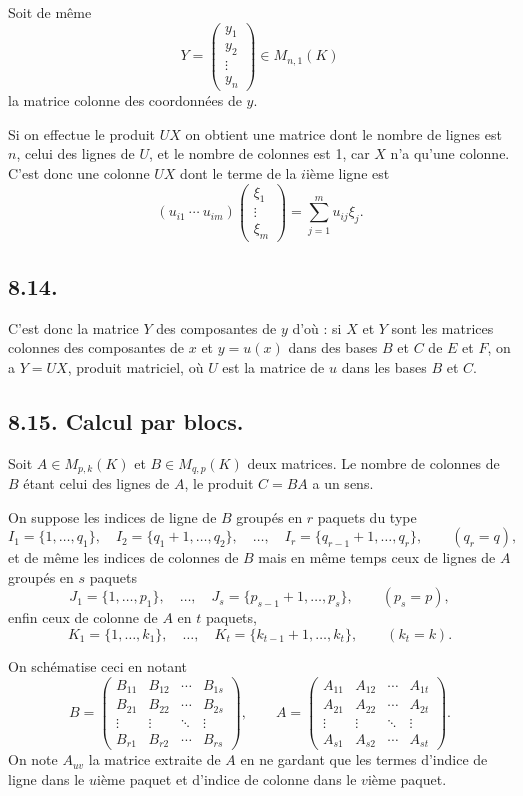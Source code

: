 Soit de même
\[
Y=\begin{pmatrix}y_1\\y_2\\\vdots\\y_n\end{pmatrix}\in M_{n,1}(K)
\]
la matrice colonne des coordonnées de $y$.

Si on effectue le produit $UX$ on obtient une matrice dont le nombre de lignes est $n$, celui des lignes de $U$, et le nombre de colonnes est 1, car $X$ n'a qu'une colonne. C'est donc une colonne $UX$ dont le terme de la $i$ième ligne est
\[
(u_{i1}\ \cdots\ u_{im})\begin{pmatrix}\xi_1\\\vdots\\\xi_m\end{pmatrix}
=\sum_{j=1}^m u_{ij}\xi_j.
\]

\subsection*{8.14.}
C'est donc la matrice $Y$ des composantes de $y$ d'où : si $X$ et $Y$ sont les matrices colonnes des composantes de $x$ et $y=u(x)$ dans des bases $B$ et $C$ de $E$ et $F$, on a $Y=UX$, produit matriciel, où $U$ est la matrice de $u$ dans les bases $B$ et $C$.

\subsection*{8.15. Calcul par blocs.}
Soit $A\in M_{p,k}(K)$ et $B\in M_{q,p}(K)$ deux matrices. Le nombre de colonnes de $B$ étant celui des lignes de $A$, le produit $C=BA$ a un sens.

On suppose les indices de ligne de $B$ groupés en $r$ paquets du type
\[
I_1=\{1,\ldots,q_1\},\quad I_2=\{q_1+1,\ldots,q_2\},\quad\ldots,\quad
I_r=\{q_{r-1}+1,\ldots,q_r\},\qquad(q_r=q),
\]
et de même les indices de colonnes de $B$ mais en même temps ceux de lignes de $A$ groupés en $s$ paquets
\[
J_1=\{1,\ldots,p_1\},\quad\ldots,\quad
J_s=\{p_{s-1}+1,\ldots,p_s\},\qquad(p_s=p),
\]
enfin ceux de colonne de $A$ en $t$ paquets,
\[
K_1=\{1,\ldots,k_1\},\quad\ldots,\quad
K_t=\{k_{t-1}+1,\ldots,k_t\},\qquad(k_t=k).
\]

On schématise ceci en notant
\[
B=\begin{pmatrix}
B_{11}&B_{12}&\cdots&B_{1s}\\
B_{21}&B_{22}&\cdots&B_{2s}\\
\vdots&\vdots&\ddots&\vdots\\
B_{r1}&B_{r2}&\cdots&B_{rs}
\end{pmatrix},\qquad
A=\begin{pmatrix}
A_{11}&A_{12}&\cdots&A_{1t}\\
A_{21}&A_{22}&\cdots&A_{2t}\\
\vdots&\vdots&\ddots&\vdots\\
A_{s1}&A_{s2}&\cdots&A_{st}
\end{pmatrix}.
\]
On note $A_{uv}$ la matrice extraite de $A$ en ne gardant que les termes d'indice de ligne dans le $u$ième paquet et d'indice de colonne dans le $v$ième paquet.


